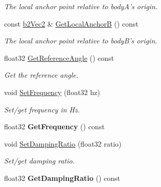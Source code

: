 \begin{DoxyCompactItemize}
\begin{DoxyCompactList}\small\item\em The local anchor point relative to body\-A's origin. \end{DoxyCompactList}\item 
\hypertarget{classb2_weld_joint_a7fdc0c047dc04bbc8c5ca67011be071c}{const \hyperlink{structb2_vec2}{b2\-Vec2} \& \hyperlink{classb2_weld_joint_a7fdc0c047dc04bbc8c5ca67011be071c}{Get\-Local\-Anchor\-B} () const }\label{classb2_weld_joint_a7fdc0c047dc04bbc8c5ca67011be071c}

\begin{DoxyCompactList}\small\item\em The local anchor point relative to body\-B's origin. \end{DoxyCompactList}\item 
\hypertarget{classb2_weld_joint_a0d347bf22be13aa8a96f615e230b095a}{float32 \hyperlink{classb2_weld_joint_a0d347bf22be13aa8a96f615e230b095a}{Get\-Reference\-Angle} () const }\label{classb2_weld_joint_a0d347bf22be13aa8a96f615e230b095a}

\begin{DoxyCompactList}\small\item\em Get the reference angle. \end{DoxyCompactList}\item 
\hypertarget{classb2_weld_joint_a0796404379b7562f1af557729085c447}{void \hyperlink{classb2_weld_joint_a0796404379b7562f1af557729085c447}{Set\-Frequency} (float32 hz)}\label{classb2_weld_joint_a0796404379b7562f1af557729085c447}

\begin{DoxyCompactList}\small\item\em Set/get frequency in Hz. \end{DoxyCompactList}\item 
\hypertarget{classb2_weld_joint_aca7b913d9d780a8fbd8c47f9fef04b7c}{float32 {\bfseries Get\-Frequency} () const }\label{classb2_weld_joint_aca7b913d9d780a8fbd8c47f9fef04b7c}

\item 
\hypertarget{classb2_weld_joint_aea79865e590edba09eff9d2243689967}{void \hyperlink{classb2_weld_joint_aea79865e590edba09eff9d2243689967}{Set\-Damping\-Ratio} (float32 ratio)}\label{classb2_weld_joint_aea79865e590edba09eff9d2243689967}

\begin{DoxyCompactList}\small\item\em Set/get damping ratio. \end{DoxyCompactList}\item 
\hypertarget{classb2_weld_joint_a99f69fbebb982382819f2955819196d7}{float32 {\bfseries Get\-Damping\-Ratio} () const }\label{classb2_weld_joint_a99f69fbebb982382819f2955819196d7}


\end{DoxyCompactItemize}
